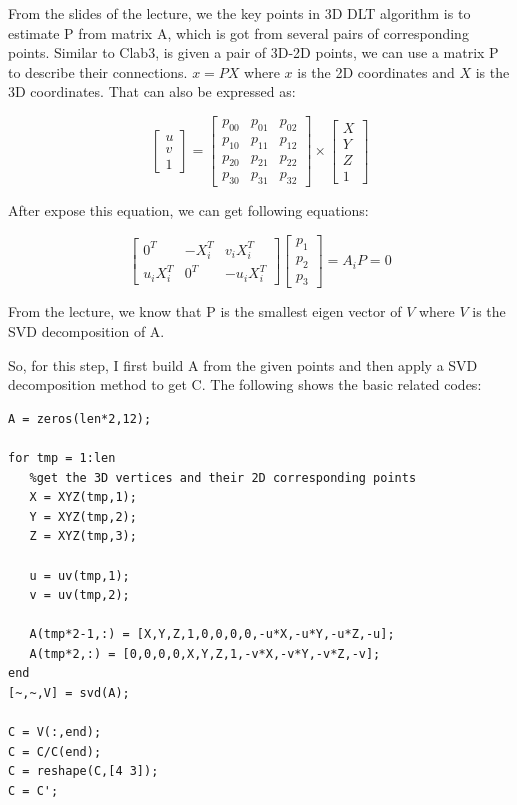 \documentclass{article}
\begin{document}
From the slides of the lecture, we the key points in 3D DLT algorithm is to estimate P from matrix A, which is got from several pairs of corresponding points. Similar to Clab3, is given a pair of 3D-2D points, we can use a matrix P to describe their connections. $x = PX$ where $x$ is the 2D coordinates and $X$ is the 3D coordinates. That can also be expressed as: 

$$\begin{bmatrix}
u \\ v \\ 1 \end{bmatrix} = \left[ \begin{array}{ccc} p_{00} & p_{01} & p_{02} \\ p_{10} & p_{11} & p_{12} \\ p_{20} & p_{21} & p_{22} \\ p_{30} & p_{31} & p_{32} \end{array} \right] \times \left[ \begin{array}{c} X \\ Y \\ Z \\ 1 \end{array} \right]$$

After expose this equation, we can get following equations: 

$$\left [\begin{array}{ccc}
0^T & -X_i^T & v_iX_i^T \\ u_iX_i^T & 0^T & -u_iX_i^T
\end{array}\right] \left[ \begin{array}{c} p_1 \\ p_2 \\ p_3 \end{array} \right] = A_iP = 0 $$

From the lecture, we know that P is the smallest eigen vector of $V$ where $V$ is the SVD decomposition of A.

So, for this step, I first build A from the given points and then apply a SVD decomposition method to get C. The following shows the basic related codes:

\begin{lstlisting}
A = zeros(len*2,12);

for tmp = 1:len
   %get the 3D vertices and their 2D corresponding points
   X = XYZ(tmp,1);
   Y = XYZ(tmp,2);
   Z = XYZ(tmp,3);
   
   u = uv(tmp,1);
   v = uv(tmp,2);
   
   A(tmp*2-1,:) = [X,Y,Z,1,0,0,0,0,-u*X,-u*Y,-u*Z,-u];
   A(tmp*2,:) = [0,0,0,0,X,Y,Z,1,-v*X,-v*Y,-v*Z,-v];
end
[~,~,V] = svd(A);

C = V(:,end);
C = C/C(end);
C = reshape(C,[4 3]);
C = C';

\end{lstlisting}
\end{document}
